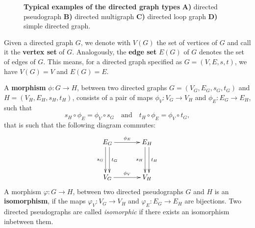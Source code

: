 \begin{figure}[!htbp]
  \centering 
  \vfill
  \vspace{0.25cm}
    \caption{%
      \textbf{Typical examples of the directed graph types}
      \textbf{A)} directed pseudograph \textbf{B)} directed
      multigraph \textbf{C)} directed loop graph \textbf{D)} simple
      directed graph.} %
  \label{fig:directed_graph_types}
\end{figure}

Given a directed graph $G$, we denote with $V(G)$ the set of vertices
of $G$ and call it the \textbf{vertex set} of $G$. Analogously, the
\textbf{edge set} $E(G)$ of $G$ denotes the set of edges of $G$. This
means, for a directed graph specified as $G = (V,E,s,t)$, we
have $V(G) = V$ and $E(G) = E$.

A \textbf{morphism} $\phi: G \to H$, between two directed graphs $G=(
V_G, E_G, \allowbreak s_G, \allowbreak t_G)$ and
$H=(V_H,E_H,s_H,t_H)$, consists of a pair of maps $\phi_V: V_G \to
V_H$ and $\phi_E: E_G \to E_H$, such that
\[
s_H \circ \phi_E = \phi_V \circ s_G \mathrm{\quad and \quad} t_H \circ
\phi_E = \phi_V \circ t_G,
\]
that is such that the following diagram commutes:
%
\begin{align*} 
  \xymatrix@+=1.3cm{E_G \ar^{t_G}@<0.66ex>[d] \ar_{s_G}@<-0.66ex>[d]
    \ar^{\phi_E}[r] & E_H \ar^{t_H}@<0.66ex>[d]
    \ar_{s_H}@<-0.66ex>[d]\\ V_G \ar^{\phi_V}[r] & V_H}
\end{align*}
%
A morphism $\varphi: G \to H$, between two directed pseudographs $G$
and $H$ is an \textbf{isomorphism}, if the maps $\varphi_V: V_G \to
V_H$ and $\varphi_E: E_G \to E_H$ are bijections. Two directed
pseudographs are called \textit{isomorphic} if there exists an
isomorphism inbetween them.

